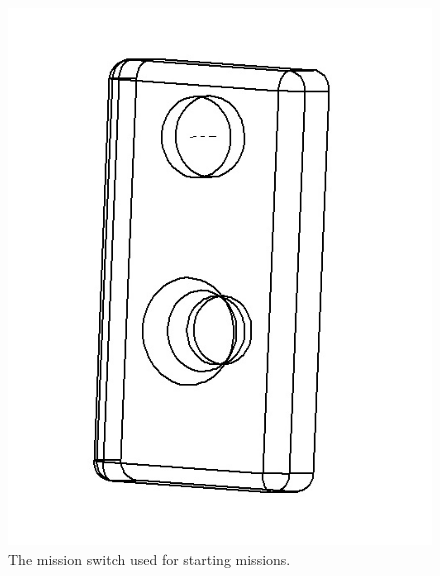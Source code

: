 \begin{figure}[!ht]
	\begin{center}
		\includegraphics[width=13.2cm]{./Images/Mechanics/msStop.jpg}
		\caption{The mission switch used for starting missions.}
		\label{SomemsStop}
	\end{center}
\end{figure}


